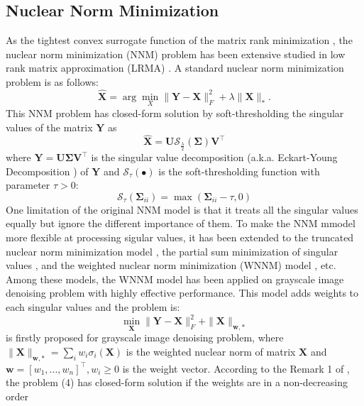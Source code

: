 \documentclass[10pt,twocolumn,letterpaper]{article}
\begin{document}
\subsection{Nuclear Norm Minimization}
As the tightest convex surrogate function of the matrix rank minimization \cite{Guaranteed,fazelPhDthesis}, the nuclear norm minimization (NNM) problem has been extensive studied in low rank matrix approximation (LRMA) \cite{srebro2003weighted,cai2010singular,candes2011robust,lin2011linearized}. A standard nuclear norm minimization problem is as follows:
\begin{equation}
\mathbf{\hat{X}}
=
\arg
\min_{X}
\|\mathbf{Y}-\mathbf{X}\|_{F}^{2}
+
\lambda
\|\mathbf{X}\|_{*}.
\end{equation}
This NNM problem has closed-form solution by soft-thresholding the singular values of the matrix $\mathbf{Y}$ as 
\begin{equation}
\mathbf{\hat{X}}
=
\mathbf{U}
\mathcal{S}_{\frac{\lambda}{2}}
(\mathbf{\Sigma})
\mathbf{V}^{\top}
\end{equation}
where $\mathbf{Y}=\mathbf{U}\mathbf{\Sigma}\mathbf{V}^{\top}$ is the singular value decomposition (a.k.a. Eckart-Young Decomposition \cite{eckart1936approximation}) of $\mathbf{Y}$ and 
$\mathcal{S}_{\tau}(\bullet)$ is the soft-thresholding function with parameter $\tau>0$:
\begin{equation}
\mathcal{S}_{\tau}
(\mathbf{\Sigma}_{ii})
=
\max(\mathbf{\Sigma}_{ii}-\tau, 0)
\end{equation}
One limitation of the original NNM model is that it treats all the singular values equally but ignore the different importance of them. To make the NNM mmodel more flexible at processing sigular values, it has been extended to the truncated nuclear norm minimization model \cite{tnnm}, the partial sum minimization of singular values \cite{PartialSum}, and the weighted nuclear norm minimization (WNNM) model \cite{wnnm}, etc. Among these models, the WNNM model has been applied on grayscale image denoising problem with highly effective performance. This model adds weights to each singular values and the problem is:
\begin{equation}
\min_{\mathbf{X}}\|\mathbf{Y}-\mathbf{X}\|_{F}^{2}
+
\|\mathbf{X}\|_{\bm{w},*}
\end{equation}
is firstly proposed for grayscale image denoising problem, where $\|\mathbf{X}\|_{\bm{w},*}=\sum_{i}w_{i}\sigma_{i}(\mathbf{X})$ is the weighted nuclear norm of matrix $\mathbf{X}$ and $\bm{w}=[w_{1},...,w_{n}]^{\top}, w_{i}\ge 0$ is the weight vector. According to the Remark 1 of \cite{wnnmijcv}, the problem (4) has closed-form solution if the weights are in a non-decreasing order
\end{document}
